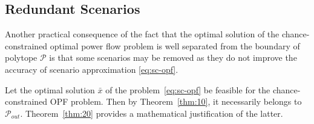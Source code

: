 





\subsection{Redundant Scenarios}\label{sec:obs}

Another practical consequence of the fact that the optimal solution of the chance-constrained optimal power flow problem is well separated from the boundary of polytope $\mathcal{P}$ is that some scenarios may be removed as they do not improve the accuracy of scenario approximation \eqref{eq:sc-opf}.

Let the optimal solution $\bar x$ of the problem~\eqref{eq:sc-opf} be feasible for the chance-constrained OPF problem. Then by Theorem~\ref{thm:10}, it necessarily belongs to $\mathcal{P}_{out}$. Theorem~\ref{thm:20} provides a mathematical justification of the latter.


